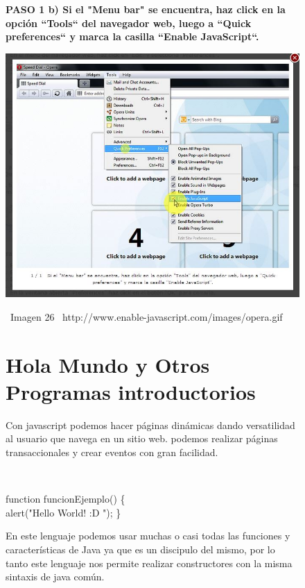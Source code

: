 \documentclass[11pt]{article} %
\begin{document}
\begin{figure}
\begin{center}

\begin{center}
\bf PASO 1
 b) Si el "Menu bar" se encuentra, haz click en la opción ``Tools`` del navegador web, luego a ``Quick preferences`` y marca la casilla ``Enable JavaScript``.


\includegraphics[height=8 cm, width=8 cm] {imagenes/opera 02.jpg}
\end{center}
\ Imagen 26
\ {http://www.enable-javascript.com/images/opera.gif}
\\

\end{center}

\section{Hola Mundo y Otros Programas introductorios}


Con javascript podemos hacer páginas dinámicas dando versatilidad al usuario que navega en un sitio web. podemos realizar páginas transaccionales y crear eventos con gran facilidad. \ \
\newline


\ \begin{tt}
function funcionEjemplo() 
\{ \\
alert("Hello World!  :D ");
  \}
\\
\end{tt}



En este lenguaje podemos usar muchas o casi todas las funciones y características de Java ya que es un discipulo del mismo, por lo tanto este lenguaje nos permite realizar constructores con la misma sintaxis de java común. \ \
\newline





\end{figure}
\end{document}
